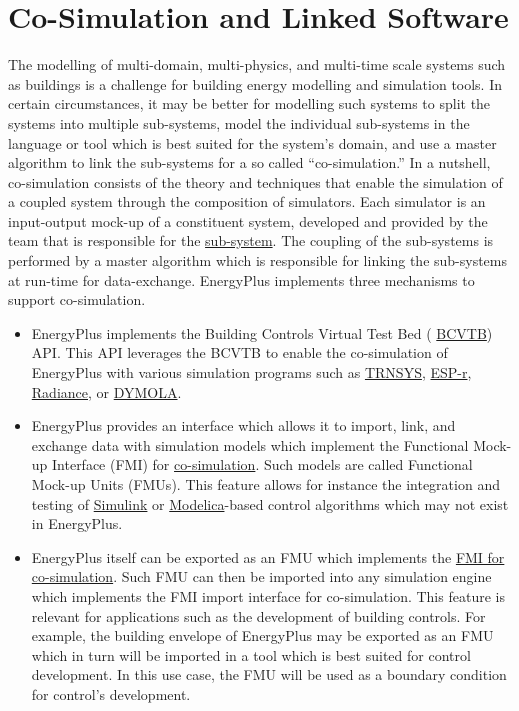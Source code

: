 \section{Co-Simulation and Linked Software}

The modelling of multi-domain, multi-physics, and multi-time scale
systems such as buildings is a challenge for building energy modelling
and simulation tools. In certain circumstances, it may be better for
modelling such systems to split the systems into multiple sub-systems,
model the individual sub-systems in the language or tool which is
best suited for the system\textquoteright s domain, and use a master
algorithm to link the sub-systems for a so called \textquotedblleft co-simulation.\textquotedblright{}
In a nutshell, co-simulation consists of the theory and techniques
that enable the simulation of a coupled system through the composition
of simulators. Each simulator is an input-output mock-up of a constituent
system, developed and provided by the team that is responsible for
the \href{https://arxiv.org/abs/1702.00686}{sub-system}. The coupling
of the sub-systems is performed by a master algorithm which is responsible
for linking the sub-systems at run-time for data-exchange. EnergyPlus
implements three mechanisms to support co-simulation.
\begin{itemize}
\item EnergyPlus implements the Building Controls Virtual Test Bed ( \href{https://www.tandfonline.com/doi/abs/10.1080/19401493.2010.518631}{BCVTB}) API. 
This API leverages the BCVTB to enable the co-simulation of EnergyPlus with various simulation programs such as \href{http://www.trnsys.com/}{TRNSYS}, 
\href{http://www.esru.strath.ac.uk/Programs/ESP-r.htm}{ESP-r}, \href{http://radsite.lbl.gov/radiance/HOME.html}{Radiance}, or 
\href{https://www.3ds.com/products-services/catia/products/dymola/}{DYMOLA}.
\item EnergyPlus provides an interface which allows it to import, link,
and exchange data with simulation models which implement the Functional
Mock-up Interface (FMI) for \href{https://www.tandfonline.com/doi/abs/10.1080/19401493.2013.808265}{co-simulation}.
Such models are called Functional Mock-up Units (FMUs). This feature
allows for instance the integration and testing of \href{https://www.mathworks.com/}{Simulink}
or \href{https://www.modelica.org/}{Modelica}-based control algorithms
which may not exist in EnergyPlus.
\item EnergyPlus itself can be exported as an FMU which implements the \href{https://simulationresearch.lbl.gov/wetter/download/2014_NouiduiWetter.pdf}{FMI for co-simulation}.
Such FMU can then be imported into any simulation engine which implements
the FMI import interface for co-simulation. This feature is relevant
for applications such as the development of building controls. For
example, the building envelope of EnergyPlus may be exported as an
FMU which in turn will be imported in a tool which is best suited
for control development. In this use case, the FMU will be used as
a boundary condition for control's development.
\end{itemize}


